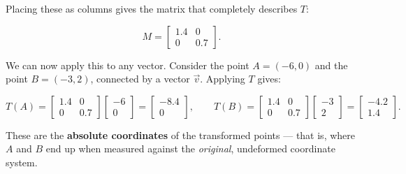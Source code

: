 \documentclass[11pt,openany]{book}
\theoremstyle{definition}
\begin{document}
Placing these as columns gives the matrix that completely describes $T$:

\[
M = \begin{bmatrix} 1.4 & 0 \\ 0 & 0.7 \end{bmatrix}.
\]

We can now apply this to any vector. Consider the point $A = (-6, 0)$ and the point 
$B = (-3, 2)$, connected by a vector $\vec{v}$.
Applying $T$ gives:

\[
T(A) = \begin{bmatrix} 1.4 & 0 \\ 0 & 0.7 \end{bmatrix} \begin{bmatrix} -6 \\ 0 \end{bmatrix} 
= \begin{bmatrix} -8.4 \\ 0 \end{bmatrix}, 
\qquad
T(B) = \begin{bmatrix} 1.4 & 0 \\ 0 & 0.7 \end{bmatrix} \begin{bmatrix} -3 \\ 2 \end{bmatrix} 
= \begin{bmatrix} -4.2 \\ 1.4 \end{bmatrix}.
\]

These are the \textbf{absolute coordinates} of the transformed points --- that is, where 
$A$ and $B$ end up when measured against the \textit{original}, undeformed coordinate system.

\medskip
\end{document}
